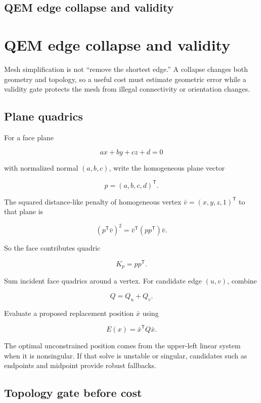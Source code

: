 \hypertarget{appendix-89db9fe1bc8a}{}
\section*{QEM edge collapse and validity}
\chapter{QEM edge collapse and validity}\label{appendix-89db9fe1bc8a-qem-edge-collapse-and-validity}

Mesh simplification is not ``remove the shortest edge.'' A collapse changes both geometry and topology, so a useful cost must estimate geometric error while a validity gate protects the mesh from illegal connectivity or orientation changes.

\section{Plane quadrics}\label{appendix-89db9fe1bc8a-plane-quadrics}

For a face plane

\[
ax+by+cz+d=0
\]

with normalized normal \((a,b,c)\), write the homogeneous plane vector

\[
p=(a,b,c,d)^{\mathsf T}.
\]

The squared distance-like penalty of homogeneous vertex \(\bar v=(x,y,z,1)^{\mathsf T}\) to that plane is

\[
(p^{\mathsf T}\bar v)^2
=
\bar v^{\mathsf T}(pp^{\mathsf T})\bar v.
\]

So the face contributes quadric

\[
K_p=pp^{\mathsf T}.
\]

Sum incident face quadrics around a vertex. For candidate edge \((u,v)\), combine

\[
Q=Q_u+Q_v.
\]

Evaluate a proposed replacement position \(\bar x\) using

\[
E(x)=\bar x^{\mathsf T}Q\bar x.
\]

The optimal unconstrained position comes from the upper-left linear system when it is nonsingular. If that solve is unstable or singular, candidates such as endpoints and midpoint provide robust fallbacks.

\section{Topology gate before cost}\label{appendix-89db9fe1bc8a-topology-gate-before-cost}


